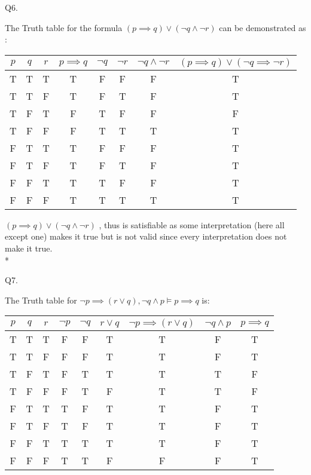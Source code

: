 \documentclass[12pt]{article}
\begin{document}
Q6.

The Truth table for the formula $(p \implies q) \lor (\neg q \land \neg r)$ can be demonstrated as :

\begin{center}
	\begin{tabular}{|c c c | c | c | c | c | c | }
	\hline
	$p$ & $q$ & $r$ & $p \implies q$ & $\neg q$ & $\neg r$ & $\neg q \land \neg r $ & $(p \implies q) \lor (\neg q \implies \neg r) $  \\ \hline
	T & T & T & T & F & F & F & T \\ \hline
	T & T & F & T & F & T & F & T \\ \hline
	T & F & T & F & T & F & F & \colorbox{red!50}{F} \\ \hline
	T & F & F & F & T & T & T & T \\ \hline
	F & T & T & T & F & F & F & T \\ \hline
	F & T & F & T & F & T & F & T \\ \hline
	F & F & T & T & T & F & F & T \\ \hline
	F & F & F & T & T & T & T & T \\ \hline
	\end{tabular}
	\end{center}

$(p \implies q) \lor (\neg q \land \neg r)$ , thus  is satisfiable as some interpretation (here all except one)  makes it true but is not valid since every interpretation does not make it true.
\\*


Q7.


The Truth table for $\neg p \implies (r \lor q), \neg q \land p \models p \implies q$ is:

\begin{center}
	\begin{tabular}{|c c c | c | c | c | c | c | c | }
	\hline
	$p$ & $q$ & $r$ & $\neg p$ & $\neg q $ & $r \lor q$ & $\neg p \implies(r \lor q)$ & $\neg q \land p $ & $p \implies q $   \\ \hline
    T & T & T & F & F & T & T & F & T\\ \hline
	T & T & F & F & F & T & T & F & T\\ \hline
	T & F & T & F & T & T & \colorbox{red!50}{T} & \colorbox{red!50}{T} & \colorbox{red!50}{F}\\ \hline
	T & F & F & F & T & F & \colorbox{red!50}{T} & \colorbox{red!50}{T} & \colorbox{red!50}{F}\\ \hline
	F & T & T & T & F & T & T & F & T\\ \hline
	F & T & F & T & F & T & T & F & T\\ \hline
	F & F & T & T & T & T & T & F & T\\ \hline
	F & F & F & T & T & F & F & F & T\\ \hline
	\end{tabular}
	\end{center}
\end{document}
